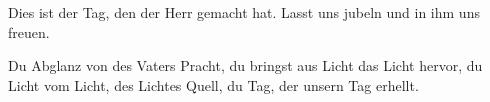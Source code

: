 \newpage

\resp


\medskip

\begin{sloppypar}
{\noindent\rm{ Dies ist der Tag, den der Herr gemacht hat. Lasst uns jubeln und in ihm uns freuen.}}
\end{sloppypar}

\medskip


\def\greinitialformat#1{{\fontsize{40}{40}\selectfont #1}}
\gresetfirstlineaboveinitial{\small \textcolor{red}{hieme}}{}
\setaboveinitialseparation{0.72mm}


\medskip

\begin{sloppypar}
{\noindent\rm{ Du Abglanz von des Vaters Pracht,
du bringst aus Licht das Licht hervor,
du Licht vom Licht, des Lichtes Quell, du Tag, der unsern Tag erhellt.}}
\end{sloppypar}

\medskip

